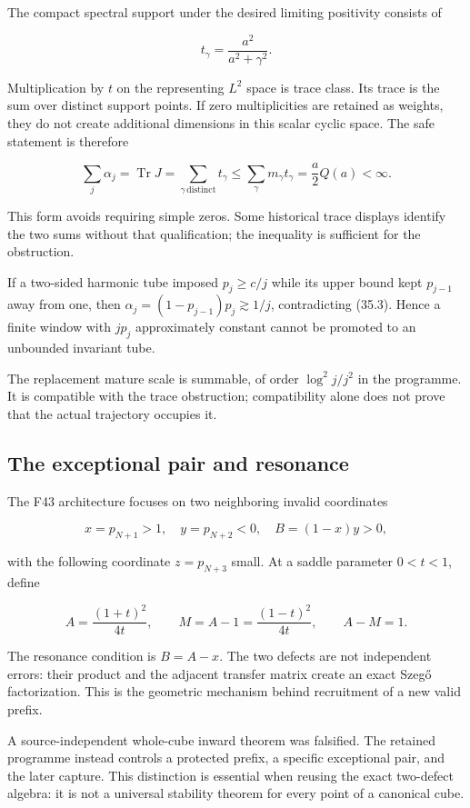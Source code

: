 \documentclass[
  10pt,
  a4paper,
  10pt,
  oneside,
  openany]{book}
\begin{document}
The compact spectral support under the desired limiting positivity
consists of

\[
 t_\gamma=\frac{a^2}{a^2+\gamma^2}.
\]

Multiplication by \(t\) on the representing \(L^2\) space is trace
class. Its trace is the sum over distinct support points. If zero
multiplicities are retained as weights, they do not create additional
dimensions in this scalar cyclic space. The safe statement is therefore

\[
 \sum_j\alpha_j=\operatorname{Tr}J
 =\sum_{\gamma\,\mathrm{distinct}}t_\gamma
 \le\sum_\gamma m_\gamma t_\gamma
 =\frac a2Q(a)<\infty.
 \tag{35.3}\label{eq:35.3}
\]

This form avoids requiring simple zeros. Some historical trace displays
identify the two sums without that qualification; the inequality is
sufficient for the obstruction.

If a two-sided harmonic tube imposed \(p_j\ge c/j\) while its upper
bound kept \(p_{j-1}\) away from one, then
\(\alpha_j=(1-p_{j-1})p_j\gtrsim1/j\), contradicting (35.3). Hence a
finite window with \(jp_j\) approximately constant cannot be promoted to
an unbounded invariant tube.

The replacement mature scale is summable, of order \(\log^2j/j^2\) in
the programme. It is compatible with the trace obstruction;
compatibility alone does not prove that the actual trajectory occupies
it.

\subsection{The exceptional pair and
resonance}\label{the-exceptional-pair-and-resonance}

The F43 architecture focuses on two neighboring invalid coordinates

\[
 x=p_{N+1}>1,\quad y=p_{N+2}<0,\quad
 B=(1-x)y>0,
\]

with the following coordinate \(z=p_{N+3}\) small. At a saddle parameter
\(0<t<1\), define

\[
 A=\frac{(1+t)^2}{4t},\qquad
 M=A-1=\frac{(1-t)^2}{4t},\qquad A-M=1.
 \tag{35.4}\label{eq:35.4}
\]

The resonance condition is \(B=A-x\). The two defects are not
independent errors: their product and the adjacent transfer matrix
create an exact Szegő factorization. This is the geometric mechanism
behind recruitment of a new valid prefix.

A source-independent whole-cube inward theorem was falsified. The
retained programme instead controls a protected prefix, a specific
exceptional pair, and the later capture. This distinction is essential
when reusing the exact two-defect algebra: it is not a universal
stability theorem for every point of a canonical cube.
\end{document}
